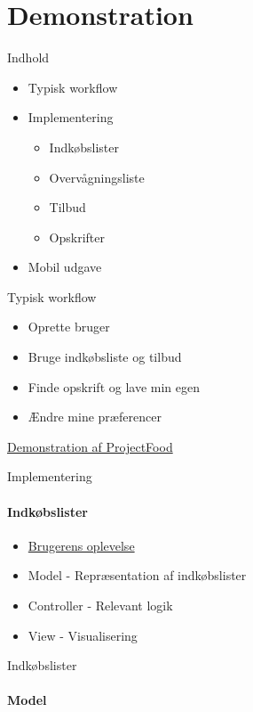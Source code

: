\section{Demonstration}

\begin{frame}{Indhold}
    \begin{itemize}
        \item Typisk workflow
        \item Implementering
        \begin{itemize}
	    	\item Indkøbslister
	    	\item Overvågningsliste
	    	\item Tilbud
	    	\item Opskrifter
        \end{itemize}
        \item Mobil udgave    
    \end{itemize}
\end{frame}

\begin{frame}{Typisk workflow}
	\begin{itemize}
	\item Oprette bruger
	\item Bruge indkøbsliste og tilbud
	\item Finde opskrift og lave min egen
	\item Ændre mine præferencer
	\end{itemize}
	\href{http://james:8080}{Demonstration af ProjectFood}
\end{frame}

\begin{frame}{Implementering}
	\framesubtitle{Indkøbslister}
	\begin{itemize}
	\item \href{http://james:8080/ShoppingLists}{Brugerens oplevelse}
	\vspace{20pt}
	\item Model - Repræsentation af indkøbslister
	\item Controller - Relevant logik
	\item View - Visualisering
	\end{itemize}	
\end{frame}

\begin{frame}{Indkøbslister}
	\framesubtitle{Model}
\end{frame}